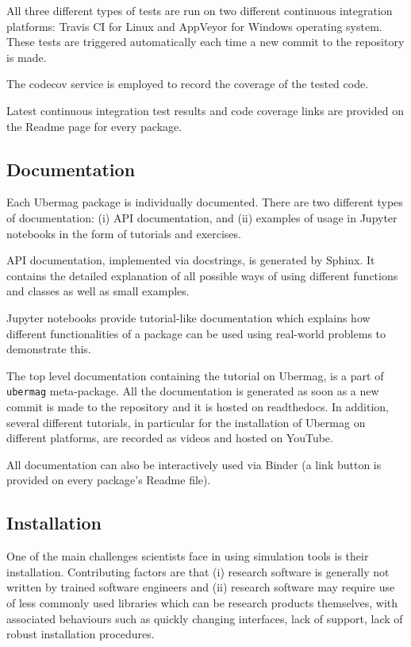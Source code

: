 \documentclass{deliverablereport}
\begin{document}
All three different types of tests are run on two different continuous
integration platforms: Travis CI for Linux and AppVeyor for Windows
operating system. These tests are triggered automatically each time a new commit to
the repository is made.

The codecov service is employed to record the
coverage of the tested code.

Latest continuous integration test results and code coverage links are
provided on the Readme page for every package.

\subsection{Documentation}

Each Ubermag package is individually
documented. There are two different types of documentation: (i) API
documentation, and (ii) examples of usage in Jupyter notebooks in the
form of tutorials and exercises.

API documentation, implemented via
docstrings, is generated by Sphinx. It contains the detailed
explanation of all possible ways of using different functions and
classes as well as small examples.

Jupyter notebooks provide tutorial-like documentation which explains
how different functionalities of a package can be used using
real-world problems to demonstrate this.

The top level documentation containing the tutorial on Ubermag, is a
part of \texttt{ubermag} meta-package. All the documentation is
generated as soon as a new commit is made to the repository and it is
hosted on readthedocs. In addition, several different tutorials, in
particular for the installation of Ubermag on different platforms, are
recorded as videos and hosted on YouTube.

All documentation can also be interactively used via Binder (a link
button is provided on every package's Readme file).

\subsection{Installation}

One of the main challenges scientists face in using simulation tools
is their installation. Contributing factors are that (i) research
software is generally not written by trained software engineers and
(ii) research software may require use of less commonly used libraries
which can be research products themselves, with associated behaviours
such as quickly changing interfaces, lack of support, lack of robust
installation procedures.
\end{document}
